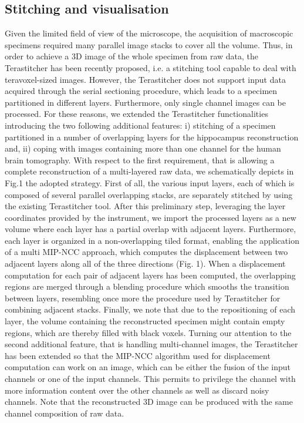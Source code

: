 \documentclass[12pt]{spieman}  %
\begin{document}
	\subsection{Stitching and visualisation}
	
Given the limited field of view of the microscope, the acquisition of macroscopic specimens required many parallel image stacks to cover all the volume. Thus, in order to achieve a 3D image of the whole specimen from raw data, the Terastitcher\cite{Bria2012} has been recently proposed, i.e. a stitching tool capable to deal with teravoxel-sized images. However, the Terastitcher does not support input data acquired through the serial sectioning procedure, which leads to a specimen partitioned in different layers. Furthermore, only single channel images can be processed. For these reasons, we extended the Terastitcher functionalities introducing the two following additional features: i) stitching of a specimen partitioned in a number of overlapping layers for the hippocampus reconstruction and, ii) coping with images containing more than one channel for the human brain tomography.
With respect to the first requirement, that is allowing a complete reconstruction of a multi-layered raw data, we schematically depicts in Fig.1 the adopted strategy. First of all, the various input layers, each of which is composed of several parallel overlapping stacks, are separately stitched by using the existing Terastitcher tool. After this preliminary step,  leveraging the layer coordinates provided by the instrument, we import the processed layers as a new volume where each layer has a partial overlap with adjacent layers.  Furthermore, each layer is organized in a non-overlapping tiled format, enabling the application of a multi MIP-NCC approach\cite{Bria2012}, which computes the displacement  between two adjacent layers along all of the three directions (Fig. 1). When a displacement computation for each pair of adjacent layers has been computed, the overlapping regions are merged through a blending procedure which smooths the transition between layers, resembling once more the procedure used by Terastitcher for combining adjacent stacks. Finally, we note that due to the repositioning of each layer, the volume containing the reconstructed specimen might contain empty regions, which are thereby filled with black voxels. 
Turning our attention to the second additional feature, that is handling multi-channel images, the Terastitcher has been extended so that the MIP-NCC algorithm used for displacement computation can work on an image, which can be either 
the fusion of the input channels or one of the input channels. This permits to privilege the channel with more information content over the other channels as well as discard noisy channels. Note that the reconstructed 3D image can be produced with the same channel composition of raw data.
\end{document}
